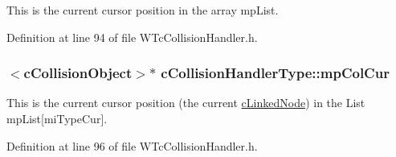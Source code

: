 This is the current cursor position in the array mpList. 



Definition at line 94 of file WTcCollisionHandler.h.

\hypertarget{classc_collision_handler_type_a1c766c06d73857bacdbf00c6eadb7836}{
\subsubsection[{mpColCur}]{$<${\bf cCollisionObject}$>$$\ast$ {\bf cCollisionHandlerType::mpColCur}}}
\label{classc_collision_handler_type_a1c766c06d73857bacdbf00c6eadb7836}


This is the current cursor position (the current \hyperlink{classc_linked_node}{cLinkedNode}) in the List mpList\mbox{[}miTypeCur\mbox{]}. 



Definition at line 96 of file WTcCollisionHandler.h.

